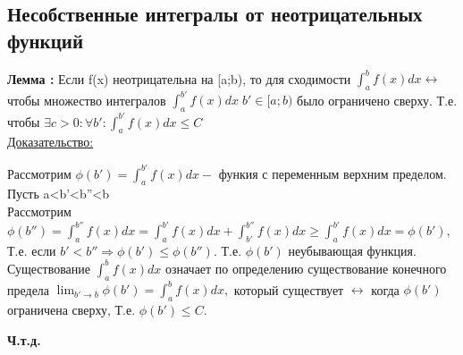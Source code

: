 \documentclass[12pt]{article}
\begin{document}
    \subsection{Несобственные интегралы от неотрицательных функций}
    \textbf{Лемма :} Если f(x) неотрицательна на [a;b), то для сходимости $\int_{a}^{b}f(x)dx \longleftrightarrow $ чтобы множество
    интегралов $\int_{a}^{b'} f(x)dx \; b' \in [a;b)$ было ограничено сверху. Т.е. чтобы $\exists c>0:\forall b':\int_{a}^{b'}f(x)dx \leq C$\\
    \underline{Доказательство:}
    \begin{adjustwidth}{1.5em}{1.5em}
        Рассмотрим $\phi(b') = \int_{a}^{b'} f(x)dx - $ функия с переменным верхним пределом.\\
        Пусть a<b'<b''<b\\
        Рассмотрим $\phi(b'')=\int_{a}^{b''}f(x)dx = \int_{a}^{b'}f(x)dx+\int_{b'}^{b''}f(x)dx\geq \int_{a}^{b'}f(x)dx=\phi(b'),$ Т.е. если $b'<b'' \Rightarrow
        \phi(b')\leq \phi(b'').$ Т.е. $\phi(b') $ неубывающая функция.\\
        Существование $\int_{a}^{b}f(x)dx$ означает по определению существование конечного предела $\lim_{b' \to b}\phi(b')=\int_{a}^{b}f(x)dx,$ который существует $\longleftrightarrow$ когда $\phi(b')$
        ограничена сверху, Т.е. $\phi(b') \leq C.$
    \end{adjustwidth}
    \begin{center}
        \textbf{Ч.т.д.}
    \end{center}
\end{document}
